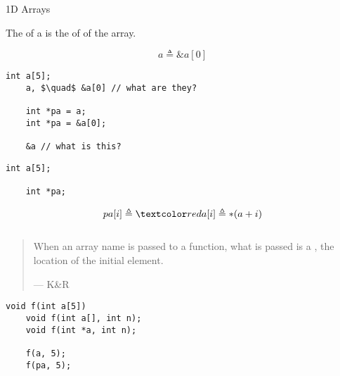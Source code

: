 \begin{frame}{}
  \centerline{\LARGE 1D Arrays}
\end{frame}

\begin{frame}[fragile]{}
  \begin{definition}
    The  of a  is the  of  of the array.

    \[
      a \triangleq \&a[0]
    \]
  \end{definition}

  \begin{lstlisting}[style = Cstyle]
    int a[5];
    a, $\quad$ &a[0] // what are they?
    
    int *pa = a; 
    int *pa = &a[0];

    &a // what is this?
  \end{lstlisting}

  \vspace{0.40cm}
  \pause
  \centerline{}
\end{frame}

\begin{frame}[fragile]{}
  \begin{lstlisting}[style = Cstyle]
    int a[5];

    int *pa;
  \end{lstlisting}

  \begin{definition}
    \[
      pa[i] \triangleq \red{a[i]} \triangleq \ast (a + i)
    \]
  \end{definition}

  \begin{lstlisting}[style = Cstyle]
  \end{lstlisting}
\end{frame}

\begin{frame}[fragile]{}
  \begin{quote}
    When an array name is passed to a function,
    what is passed is a , the location of the initial element.

    \hfill --- K\&R
  \end{quote}

  \begin{lstlisting}[style = Cstyle]
    void f(int a[5])
    void f(int a[], int n);
    void f(int *a, int n);

    f(a, 5);
    f(pa, 5);
  \end{lstlisting}
\end{frame}
